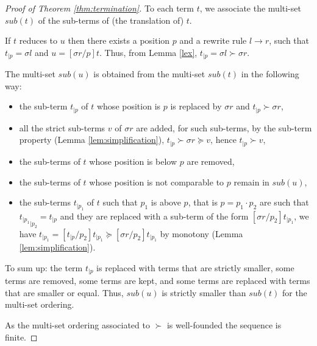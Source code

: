 \documentclass[screen, sigconf,authorversion,nonacm]{acmart}
\theoremstyle{acmdefinition}
\numberwithin{equation}{section}
\newcommand\lra{\longrightarrow}
\begin{document}
\begin{proof}[Proof of Theorem \ref{thm:termination}]
  To each term $t$, we associate the multi-set $sub(t)$ of the sub-terms of
  (the translation of) $t$.

  If $t$ reduces to $u$ then there exists a position $p$ and a rewrite
  rule $l \lra r$, such that $t_{|p} = \sigma l$ and $u = [\sigma r
  /p]t$. Thus, from Lemma \ref{lex}, $t_{|p} = \sigma l \succ \sigma r$.

  The multi-set $sub(u)$ is obtained from the multi-set $sub(t)$ in the
  following way:
  \begin{itemize}
    \item the sub-term $t_{|p}$ of $t$ whose position is $p$ 
      is replaced by $\sigma r$ and $t_{|p} \succ \sigma r$, 

    \item  all the strict sub-terms $v$ of $\sigma r$ are added,
      for such sub-terms, by
      the sub-term property (Lemma \ref{lem:simplification}),
      $ t_{|p} \succ \sigma r \succcurlyeq v $, hence
      $ t_{|p} \succ v$,

    \item the sub-terms of $t$ whose position is below $p$ 
      are removed,

    \item the sub-terms of $t$ whose position is not comparable to $p$
      remain in $sub(u)$,

    \item the sub-terms $t_{|p_1}$ of $t$ such that $p_1$ is above $p$, that is
      $p = p_1 \cdot p_2$ 
      are such that ${t_{|p_1}}_{|p_2} = t_{|p}$ 
      and they are replaced with a sub-term of the form
      $[\sigma r/p_2]t_{|p_1}$, we have $
      t_{|p_1}
      = 
      [t_{|p}/p_2]t_{|p_1}
      \succcurlyeq
      [\sigma r/p_2]t_{|p_1}$ by monotony
      (Lemma \ref{lem:simplification}).
  \end{itemize}

  To sum up:
  the term $t_{|p}$ is replaced with terms that are strictly smaller, 
  some terms are removed,
  some terms are kept,
  and
  some terms are replaced with terms
  that are smaller or equal.
  Thus,
  $sub(u)$ is strictly smaller than $sub(t)$ for the multi-set ordering.

  As the multi-set ordering associated to $\succ$ is well-founded the
  sequence is finite. \qedhere
\end{proof}
\end{document}
